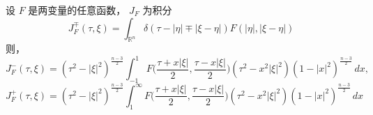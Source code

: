 \begin{lemma}\label{lem:c9-1.2}
设 $F$ 是两变量的任意函数， $J_F$ 为积分
\[
J_F^{\mp}(\tau, \xi) = \int_{\mathbb{R}^n}\delta(\tau - |\eta| \mp |\xi-\eta|)F(|\eta|, |\xi-\eta|)
\]
则，
\begin{equation}
J_F^{-}(\tau, \xi) = (\tau^2 - |\xi|^2)^{\frac{n-3}{2}}\int_{-1}^{1}F\big(\frac{\tau + x|\xi|}{2}, \frac{\tau - x|\xi|}{2}\big)(\tau^2 - x^2|\xi|^2)(1 - |x|^2)^{\frac{n-3}{2}}\, dx, \label{eq:c9-386}
\end{equation}
\begin{equation}
J_F^{+}(\tau, \xi) = (\tau^2 - |\xi|^2)^{\frac{n-3}{2}}\int_{1}^{\infty}F\big(\frac{\tau + x|\xi|}{2}, \frac{\tau - x|\xi|}{2}\big)(\tau^2 - x^2|\xi|^2)(1 - |x|^2)^{\frac{n-3}{2}}\, dx\label{eq:c9-387}
\end{equation}
\end{lemma}

